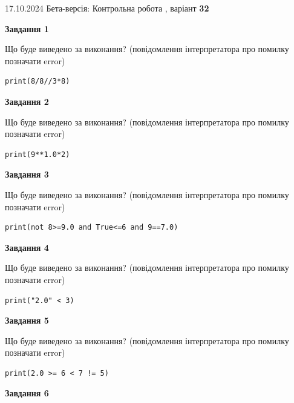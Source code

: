 \documentclass[12pt, ukrainian]{article}
\begin{document}
{\Large{17.10.2024 Бета-версія: Контрольна робота , варіант  \No \textbf { 32 }\par}}
{
\begin {large}
{\begin {center}\textbf{Завдання 1}\end {center}}

Що буде виведено за виконання? (повідомлення інтерпретатора про помилку позначати error)\par
\begin{verbatim}
print(8/8//3*8)
\end{verbatim}

{\begin {center}\textbf{Завдання 2}\end {center}}

Що буде виведено за виконання? (повідомлення інтерпретатора про помилку позначати error)\par
\begin{verbatim}
print(9**1.0*2)
\end{verbatim}

{\begin {center}\textbf{Завдання 3}\end {center}}

Що буде виведено за виконання? (повідомлення інтерпретатора про помилку позначати error)\par
\begin{verbatim}
print(not 8>=9.0 and True<=6 and 9==7.0)
\end{verbatim}

{\begin {center}\textbf{Завдання 4}\end {center}}

Що буде виведено за виконання? (повідомлення інтерпретатора про помилку позначати error)\par
\begin{verbatim}
print("2.0" < 3)
\end{verbatim}

{\begin {center}\textbf{Завдання 5}\end {center}}

Що буде виведено за виконання? (повідомлення інтерпретатора про помилку позначати error)\par
\begin{verbatim}
print(2.0 >= 6 < 7 != 5)
\end{verbatim}

{\begin {center}\textbf{Завдання 6}\end {center}}


\end{large}}
\end{document}

